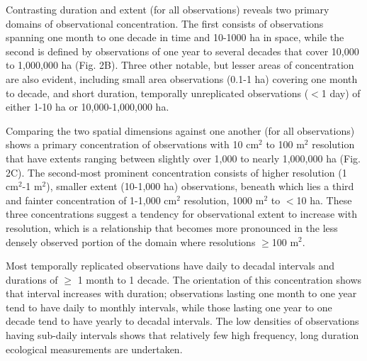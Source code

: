 \documentclass[12pt]{article}
\begin{document}


Contrasting duration and extent (for all observations) reveals two primary domains of observational concentration. The first consists of observations spanning one month to one decade in time and 10-1000 ha in space, while the second is defined by observations of one year to several decades that cover 10,000 to 1,000,000 ha (Fig. 2B).  Three other notable, but lesser areas of concentration are also evident, including small area observations (0.1-1 ha) covering one month to decade, and short duration, temporally unreplicated observations ($<$1 day) of either 1-10 ha or 10,000-1,000,000 ha. 

Comparing the two spatial dimensions against one another (for all observations) shows a primary concentration of observations with 10 cm$^2$ to 100 m$^2$ resolution that have extents ranging between slightly over 1,000 to nearly 1,000,000 ha (Fig. 2C). The second-most prominent concentration consists of higher resolution (1 cm$^2$-1 m$^2$), smaller extent (10-1,000 ha) observations, beneath which lies a third and fainter concentration of 1-1,000 cm$^2$ resolution, 1000 m$^2$ to $<$10 ha. These three concentrations suggest a tendency for observational extent to increase with resolution, which is a relationship that becomes more pronounced in the less densely observed portion of the domain where resolutions $\geq$100 m$^2$.  

Most temporally replicated observations have daily to decadal intervals and durations of $\geq$ 1 month to 1 decade. The orientation of this concentration shows that interval increases with duration; observations lasting one month to one year tend to have daily to monthly intervals, while those lasting one year to one decade tend to have yearly to decadal intervals. The low densities of observations having sub-daily intervals shows that relatively few high frequency, long duration ecological measurements are undertaken.  
\end{document}
